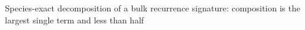 Species-exact decomposition of a bulk recurrence signature: composition is the largest single term and less than half
